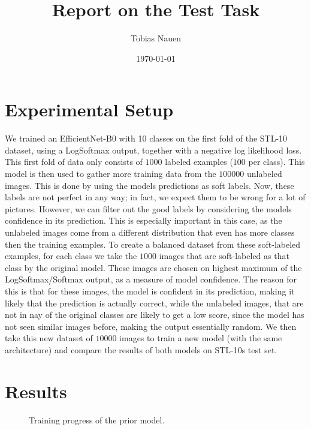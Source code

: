 \documentclass[a4paper,onecolumn,oneside,11pt,english,bibliography=totoc]{article}
\title{Report on the Test Task}
\author{
	Tobias Nauen
}
\date{\today}
\newcommand{\1}{\mathds{1}}
\theoremstyle{breakit}
\theoremstyle{break}
\begin{document}
	\maketitle
	\section*{Experimental Setup}
	We trained an EfficientNet-B0 with 10 classes on the first fold of the STL-10 dataset, using a LogSoftmax output, together with a negative log likelihood loss. This first fold of data only consists of $1000$ labeled examples ($100$ per class). This model is then used to gather more training data from the $100 000$ unlabeled images. This is done by using the models predictions as soft labels. Now, these labels are not perfect in any way; in fact, we expect them to be wrong for a lot of pictures. However, we can filter out the good labels by considering the models confidence in its prediction. This is especially important in this case, as the unlabeled images come from a different distribution that even has more classes then the training examples. To create a balanced dataset from these soft-labeled examples, for each class we take the $1000$ images that are soft-labeled as that class by the original model. These images are chosen on highest maximum of the LogSoftmax/Softmax output, as a measure of model confidence. The reason for this is that for these images, the model is confident in its prediction, making it likely that the prediction is actually correct, while the unlabeled images, that are not in nay of the original classes are likely to get a low score, since the model has not seen similar images before, making the output essentially random. We then take this new dataset of $10000$ images to train a new model (with the same architecture) and compare the results of both models on STL-10s test set.
	
	\section*{Results}
	\begin{figure}[h]
	    \centering
	    \resizebox{\textwidth}{!}{}
	    \caption{Training progress of the prior model.}
	    \label{fig:training_prior}
	\end{figure}
	
	\begin{table}[h]
	    \centering
	    \caption{Stats of the soft-labeled dataset of $10000$ images.}
	    \label{tab:soft_dataset_stats}
	\end{table}
	
\end{document}
